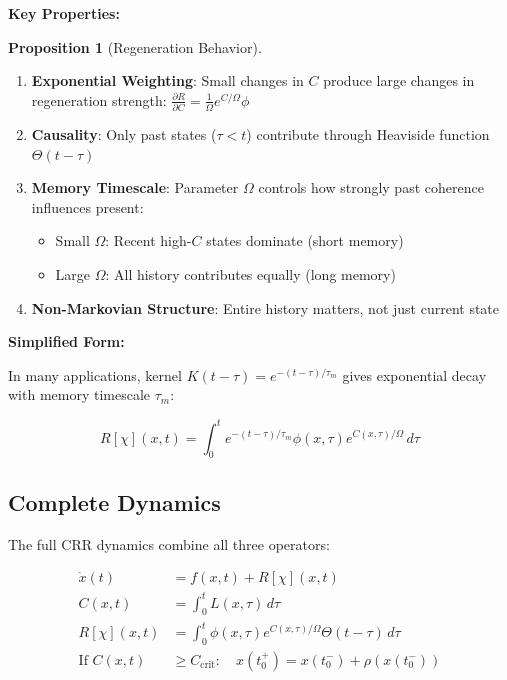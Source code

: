 \documentclass[11pt,a4paper]{article}
\theoremstyle{definition}
\newtheorem{proposition}{Proposition}[section]
\theoremstyle{remark}
\begin{document}
\textbf{Key Properties:}

\begin{proposition}[Regeneration Behavior]
\begin{enumerate}
\item \textbf{Exponential Weighting}: Small changes in $C$ produce large changes in regeneration strength: $\frac{\partial R}{\partial C} = \frac{1}{\Omega} e^{C/\Omega} \phi$

\item \textbf{Causality}: Only past states ($\tau < t$) contribute through Heaviside function $\Theta(t-\tau)$

\item \textbf{Memory Timescale}: Parameter $\Omega$ controls how strongly past coherence influences present:
\begin{itemize}
\item Small $\Omega$: Recent high-$C$ states dominate (short memory)
\item Large $\Omega$: All history contributes equally (long memory)
\end{itemize}

\item \textbf{Non-Markovian Structure}: Entire history matters, not just current state
\end{enumerate}
\end{proposition}

\textbf{Simplified Form:}

In many applications, kernel $K(t-\tau) = e^{-(t-\tau)/\tau_m}$ gives exponential decay with memory timescale $\tau_m$:

\begin{equation}
R[\chi](x,t) = \int_0^t e^{-(t-\tau)/\tau_m} \phi(x,\tau) e^{C(x,\tau)/\Omega}\,d\tau
\label{eq:regeneration-simple}
\end{equation}

\subsection{Complete Dynamics}

The full CRR dynamics combine all three operators:

\begin{equation}
\boxed{
\begin{aligned}
\dot{x}(t) &= f(x,t) + R[\chi](x,t) \\
C(x,t) &= \int_0^t L(x,\tau)\,d\tau \\
R[\chi](x,t) &= \int_0^t \phi(x,\tau) e^{C(x,\tau)/\Omega} \Theta(t-\tau)\,d\tau \\
\text{If } C(x,t) &\geq C_{\text{crit}}: \quad x(t_0^+) = x(t_0^-) + \rho(x(t_0^-))
\end{aligned}
}
\label{eq:full-crr-dynamics}
\end{equation}
\end{document}
